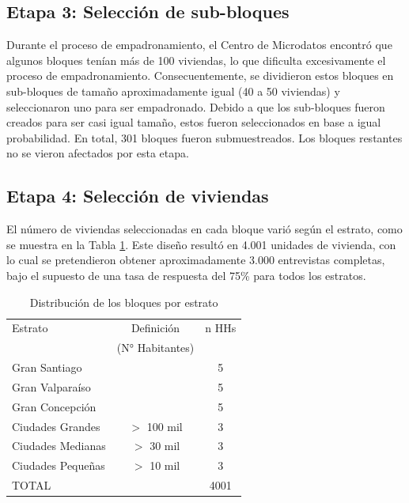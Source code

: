 \documentclass[12pt]{report}
\begin{document}
\subsection*{Etapa 3: Selección de sub-bloques}

Durante el proceso de empadronamiento, el Centro de Microdatos encontró que algunos bloques tenían más de 100 viviendas, lo que dificulta excesivamente el proceso de empadronamiento. Consecuentemente, se dividieron estos  bloques en sub-bloques de tamaño aproximadamente igual (40 a 50 viviendas) y seleccionaron uno para ser empadronado. Debido a que los sub-bloques fueron creados para ser casi igual tamaño, estos fueron seleccionados en base a igual probabilidad. En total, 301 bloques fueron submuestreados. Los bloques restantes no se vieron afectados por esta etapa.\\

\subsection*{Etapa 4: Selección de viviendas}

El número de viviendas seleccionadas en cada bloque varió según el estrato, como se muestra en la Tabla \ref{table:bloques}. Este diseño resultó en 4.001 unidades de vivienda, con lo cual se pretendieron obtener aproximadamente 3.000 entrevistas completas, bajo el supuesto de una tasa de respuesta del 75\% para todos los estratos. \\

\begin{table}[H]
	\centering
	\caption{Distribución de los bloques por estrato}
	\label{table:bloques}	
	\begin{tabular}{l c c}
		\toprule
		Estrato	& Definición& n HHs \\
		& (N° Habitantes) &  \\			
		\midrule
		Gran Santiago     && 5	 \\
		Gran Valparaíso	  && 5	 \\
		Gran Concepción   && 5	 \\
		Ciudades Grandes  &  $>$ 100 mil &	3	    \\
		Ciudades Medianas &  $>$ 30 mil  &  3	    \\
		Ciudades Pequeñas &	 $>$ 10 mil	 &  3	    \\
		TOTAL		      && 4001	 \\
		\bottomrule
	\end{tabular}
\end{table}
\end{document}
